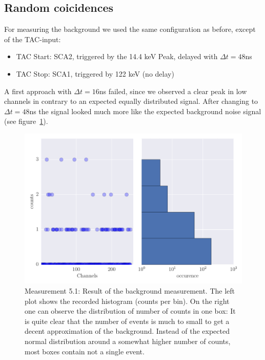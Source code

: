 \subsection{Random coicidences}
\label{ssub:Random coicidences}
For measuring the background we used the same configuration as before, except of the TAC-input:
\begin{itemize}
    \item TAC Start: SCA2, triggered by the 14.4 keV Peak, delayed with $\Delta t = 48$ns
    \item TAC Stop: SCA1, triggered by 122 keV (no delay)
\end{itemize}
A first approach with $\Delta t = 16$ns failed, since we observed a clear peak in low channels in contrary
to an expected equally distributed signal. After changing to $\Delta t=48$ns the signal looked much more 
like the expected background noise signal (see figure~\ref{fig:5_1}).
\begin{figure}[htpb]
    \centering
    \includegraphics[width=1.0\linewidth]{analysis/figures/plot5_1_hist}
    \caption{
        Measurement 5.1: Result of the background measurement. 
        The left plot shows the recorded histogram (counts per bin). 
        On the right one can observe the distribution of number of counts 
        in one box: It is quite clear that the number of events is much to small 
        to get a decent approximation of the background. Instead of the expected 
        normal distribution around a somewhat higher number of counts, most boxes 
        contain not a single event. 
        }
    \label{fig:5_1}
\end{figure}

\clearpage

